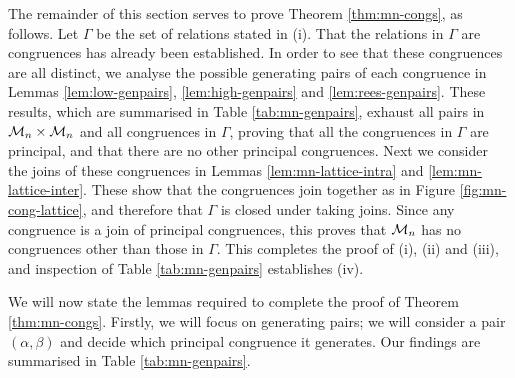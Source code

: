The remainder of this section serves to prove Theorem \ref{thm:mn-congs}, as
follows.  Let $\Gamma$ be the set of relations stated in (i).  That the
relations in $\Gamma$ are congruences has already been established.  In order to
see that these congruences are all distinct, we analyse the possible generating
pairs of each congruence in Lemmas \ref{lem:low-genpairs},
\ref{lem:high-genpairs} and \ref{lem:rees-genpairs}.  These results, which are
summarised in Table \ref{tab:mn-genpairs}, exhaust all pairs in
$\mathcal{M}_n \times \mathcal{M}_n$ and all congruences in $\Gamma$, proving that all the
congruences in $\Gamma$ are principal, and that there are no other principal
congruences.  Next we consider the joins of these congruences in Lemmas
\ref{lem:mn-lattice-intra} and \ref{lem:mn-lattice-inter}.  These show that the
congruences join together as in Figure \ref{fig:mn-cong-lattice}, and therefore
that $\Gamma$ is closed under taking joins.  Since any congruence is a join of
principal congruences, this proves that $\mathcal{M}_n$ has no congruences other than
those in $\Gamma$.  This completes the proof of (i), (ii) and (iii), and
inspection of Table \ref{tab:mn-genpairs} establishes (iv).

We will now state the lemmas required to complete the
proof of Theorem \ref{thm:mn-congs}.  Firstly, we will focus on generating
pairs; we will consider a pair $(\alpha, \beta)$ and decide which principal
congruence it generates.  Our findings are summarised in Table
\ref{tab:mn-genpairs}.

